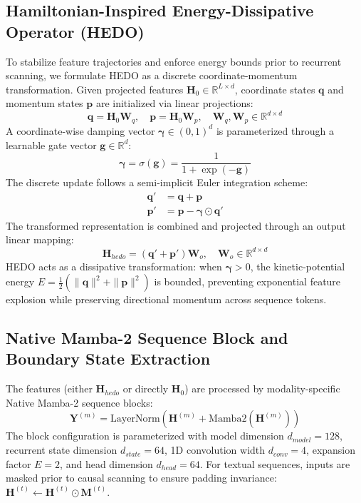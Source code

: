 \documentclass[journal]{IEEEtran}
\begin{document}
\subsection{Hamiltonian-Inspired Energy-Dissipative Operator (HEDO)}
To stabilize feature trajectories and enforce energy bounds prior to recurrent scanning, we formulate HEDO as a discrete coordinate-momentum transformation. Given projected features $\mathbf{H}_0 \in \mathbb{R}^{L \times d}$, coordinate states $\mathbf{q}$ and momentum states $\mathbf{p}$ are initialized via linear projections:
\begin{equation}
\mathbf{q} = \mathbf{H}_0 \mathbf{W}_q, \quad \mathbf{p} = \mathbf{H}_0 \mathbf{W}_p, \quad \mathbf{W}_q, \mathbf{W}_p \in \mathbb{R}^{d \times d}
\end{equation}
A coordinate-wise damping vector $\boldsymbol{\gamma} \in (0, 1)^d$ is parameterized through a learnable gate vector $\mathbf{g} \in \mathbb{R}^d$:
\begin{equation}
\boldsymbol{\gamma} = \sigma(\mathbf{g}) = \frac{1}{1 + \exp(-\mathbf{g})}
\end{equation}
The discrete update follows a semi-implicit Euler integration scheme:
\begin{align}
\mathbf{q}' &= \mathbf{q} + \mathbf{p} \label{eq:hedo_q} \\
\mathbf{p}' &= \mathbf{p} - \boldsymbol{\gamma} \odot \mathbf{q}' \label{eq:hedo_p}
\end{align}
The transformed representation is combined and projected through an output linear mapping:
\begin{equation}
\mathbf{H}_{hedo} = (\mathbf{q}' + \mathbf{p}') \mathbf{W}_o, \quad \mathbf{W}_o \in \mathbb{R}^{d \times d}
\end{equation}
HEDO acts as a dissipative transformation: when $\boldsymbol{\gamma} > 0$, the kinetic-potential energy $E = \frac{1}{2}(\|\mathbf{q}\|^2 + \|\mathbf{p}\|^2)$ is bounded, preventing exponential feature explosion while preserving directional momentum across sequence tokens.

\subsection{Native Mamba-2 Sequence Block and Boundary State Extraction}
The features (either $\mathbf{H}_{hedo}$ or directly $\mathbf{H}_0$) are processed by modality-specific Native Mamba-2 sequence blocks:
\begin{equation}
\mathbf{Y}^{(m)} = \text{LayerNorm}\left(\mathbf{H}^{(m)} + \text{Mamba2}(\mathbf{H}^{(m)})\right)
\end{equation}
The block configuration is parameterized with model dimension $d_{model} = 128$, recurrent state dimension $d_{state} = 64$, 1D convolution width $d_{conv} = 4$, expansion factor $E = 2$, and head dimension $d_{head} = 64$. For textual sequences, inputs are masked prior to causal scanning to ensure padding invariance: $\mathbf{H}^{(t)} \leftarrow \mathbf{H}^{(t)} \odot \mathbf{M}^{(t)}$.
\end{document}
